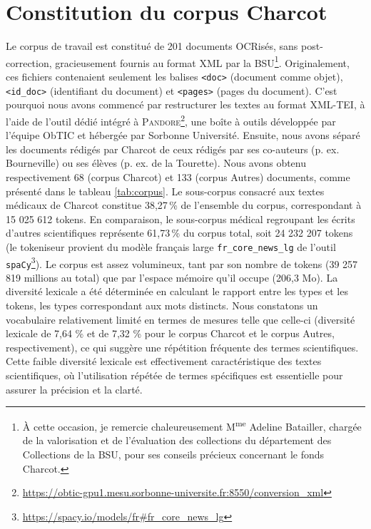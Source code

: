 \section{Constitution du corpus Charcot}
Le corpus de travail est constitué de 201 documents OCRisés, sans post-correction, gracieusement fournis au format \textsc{XML} par la \textsc{BSU}\footnote{À cette occasion, je remercie chaleureusement M\textsuperscript{me} Adeline Batailler, chargée de la valorisation et de l'évaluation des collections du département des Collections de la \textsc{BSU}, pour ses conseils précieux concernant le fonds Charcot.}. Originalement, ces fichiers contenaient seulement les balises \texttt{<doc>} (document comme objet), \texttt{<id\_doc>} (identifiant du document) et \texttt{<pages>} (pages du document). C'est pourquoi nous avons commencé par restructurer les textes au format \textsc{XML-TEI}, à l'aide de l’outil dédié intégré à \textsc{Pandore}\footnote{\url{https://obtic-gpu1.mesu.sorbonne-universite.fr:8550/conversion_xml}}, une boîte à outils développée par l'équipe ObTIC et hébergée par Sorbonne Université. 
Ensuite, nous avons séparé les documents rédigés par Charcot de ceux rédigés par ses co-auteurs (p. ex. Bourneville) ou ses élèves (p. ex. de la Tourette). Nous avons obtenu respectivement 68 (corpus \og{}Charcot\fg{}) et 133 (corpus \og{}Autres\fg{}) documents, comme présenté dans le tableau \ref{tab:corpus}. Le sous-corpus consacré aux textes médicaux de Charcot constitue 38,27 \% de l’ensemble du corpus, correspondant à 15 025 612 tokens. En comparaison, le sous-corpus médical regroupant les écrits d'autres scientifiques représente 61,73 \% du corpus total, soit 24 232 207 tokens (le tokeniseur provient du modèle français large \texttt{fr\_core\_news\_lg} de l'outil \texttt{spaCy}\footnote{\url{https://spacy.io/models/fr\#fr_core_news_lg}}). Le corpus est assez volumineux, tant par son nombre de tokens (39 257 819 millions au total) que par l'espace mémoire qu'il occupe (206,3 Mo). La diversité lexicale a été déterminée en calculant le rapport entre les types et les tokens, les types correspondant aux mots distincts. Nous constatons un vocabulaire relativement limité en termes de mesures telle que celle-ci (diversité lexicale de 7,64 \% et de 7,32 \% pour le corpus Charcot et le corpus Autres, respectivement), ce qui suggère une répétition fréquente des termes scientifiques. Cette faible diversité lexicale est effectivement caractéristique des textes scientifiques, où l'utilisation répétée de termes spécifiques est essentielle pour assurer la précision et la clarté.

